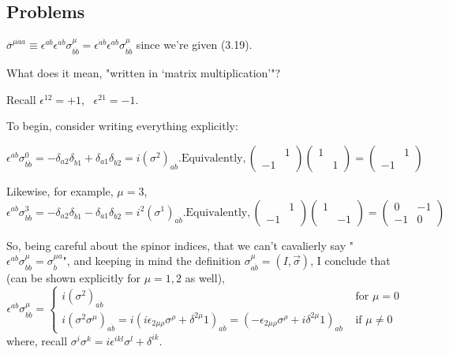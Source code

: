 \documentclass[twoside]{amsart}
\newcommand{\solutionhead}[1]
  {\smallskip
   \noindent{\large\bf Solution #1.}
   }
\begin{document}
\subsection*{Problems}





\solutionhead{35.1}

$\overline{\sigma}^{\mu \dot{a} a} \equiv \epsilon^{ab} \epsilon^{\dot{a} \dot{b} } \sigma^{\mu}_{b\dot{b}} = \epsilon^{\dot{a} \dot{b}} \epsilon^{ab} \sigma^{\mu}_{b\dot{b}}$ since we're given (3.19).  

What does it mean, "written in `matrix multiplication'"?  

Recall $\epsilon^{12} = + 1$, \, $\epsilon^{21} = -1$.  

To begin, consider writing everything explicitly:

\[
\epsilon^{ab} \sigma^0_{b\dot{b}} = -\delta_{a2} \delta_{\dot{b} 1} + \delta_{a1} \delta_{\dot{b} 2} = i ( \sigma^2)_{a\dot{b}}.  \text{Equivalently}, \left( \begin{matrix} & 1 \\ -1 & \end{matrix} \right) \left( \begin{matrix} 1 & \\ & 1 \end{matrix} \right) = \left( \begin{matrix} & 1 \\ -1 & \end{matrix} \right) 
\]

Likewise, for example, $\mu =3$, 
\[
\epsilon^{ab} \sigma^3_{b\dot{b}} = -\delta_{a2} \delta_{\dot{b} 1} - \delta_{a1} \delta_{\dot{b} 2} = i^2 ( \sigma^1)_{a\dot{b}}.  \text{Equivalently}, \left( \begin{matrix} & 1 \\ -1 & \end{matrix} \right) \left( \begin{matrix} 1 & \\ & -1 \end{matrix} \right) = \left( \begin{matrix} 0 & -1 \\ -1 & 0 \end{matrix} \right) 
\]

So, being careful about the spinor indices, that we can't cavalierly say "$\epsilon^{ab} \sigma^{\mu}_{b\dot{b}} = \sigma^{\mu a}_{\dot{b}}$", and keeping in mind the definition $\sigma^{\mu}_{a\dot{b}} = (I, \vec{\sigma})$, I conclude that (can be shown explicitly for $\mu = 1,2$ as well), 
\[
\epsilon^{ab} \sigma^{\mu}_{b\dot{b}} = \begin{cases} i (\sigma^2)_{a\dot{b}} & \text{ for } \mu =0 \\ 
i (\sigma^2 \sigma^{\mu})_{a\dot{b}} = i ( i \epsilon_{2\mu \rho} \sigma^{\rho} + \delta^{2\mu } 1 ) _{a\dot{b}} = ( - \epsilon_{2\mu \rho} \sigma^{\rho} + i \delta^{2\mu} 1 )_{a\dot{b}} & \text{ if } \mu \neq 0 
\end{cases}
\]
where, recall $\sigma^i \sigma^k =  i \epsilon^{ikl} \sigma^l + \delta^{ik}$.  
\end{document}
